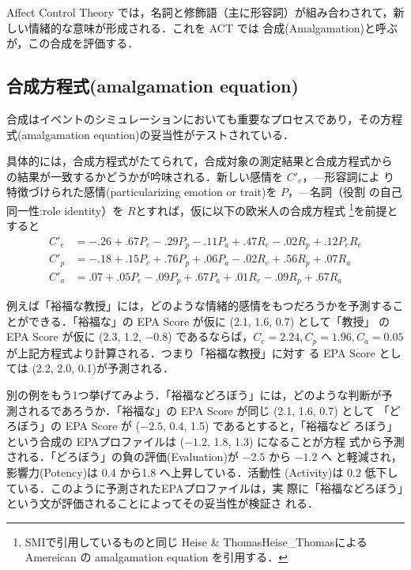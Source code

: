 \documentclass[japanese]{jnlp_1.3d}
\newcommand{\citep}{}
\begin{document}
Affect Control Theory では，名詞と修飾語（主に形容詞）が組み合わされて，新
しい情緒的な意味が形成される．これを ACT では 合成(Amalgamation)と呼ぶ
が，この合成を評価する．



\subsection{合成方程式(amalgamation equation)}
合成はイベントのシミュレーションにおいても重要なプロセスであり，その方程
式(amalgamation equation)の妥当性がテストされている．

具体的には，合成方程式がたてられて，合成対象の測定結果と合成方程式から
の結果が一致するかどうかが吟味される．新しい感情を $C'_e$，—形容詞によ
り特徴づけられた感情(particularizing emotion or trait)を $P$，—名詞（役割
の自己同一性:role identity）を $R$とすれば，仮に以下の欧米人の合成方程式
\footnote{\citep{SMI}で引用しているものと同じ Heise \&
Thomas\citep{Heise_Thomas}による Amereican の amalgamation equation を引用する．}を前提とすると
\begin{align}
\label{key:eqn:amalgamWestern}
 C'_e & = -.26 + .67 P_e -.29 P_p -.11 P_a + .47 R_e - .02 R_p + .12 P_e
  R_e \nonumber \\
 C'_p & = -.18 + .15 P_e +.76 P_p +.06 P_a - .02 R_e + .56 R_p + .07
  R_a \\
 C'_a & =  .07 + .05 P_e -.09 P_p +.67 P_a + .01 R_e - .09 R_p + .67 R_a
  \nonumber 
\end{align}

例えば「裕福な教授」には，どのような情緒的感情をもつだろうかを予測するこ
とができる．「裕福な」の EPA Score が仮に (2.1, 1.6, 0.7) として「教授」
の EPA Score が仮に (2.3, 1.2, $-0.8$) であるならば，$C_e = 2.24,  C_p =
1.96, C_a = 0.05$が上記方程式より計算される．つまり「裕福な教授」に対す
る EPA Score としては (2.2, 2.0, 0.1)が予測される．
 
別の例をもう1つ挙げてみよう．「裕福などろぼう」には，どのような判断が予
測されるであろうか．「裕福な」の EPA Score が同じ (2.1, 1.6, 0.7) として
「どろぼう」の EPA Score が ($-2.5$, 0.4, 1.5) であるとすると，「裕福など
ろぼう」という合成の EPAプロファイルは ($-1.2$, 1.8, 1.3) になることが方程
式から予測される．「どろぼう」の負の評価(Evaluation)が $-2.5$ から $-1.2$ へ
と軽減され，影響力(Potency)は 0.4 から1.8 へ上昇している．活動性
(Activity)は 0.2 低下している．このように予測されたEPAプロファイルは，実
際に「裕福などろぼう」という文が評価されることによってその妥当性が検証さ
れる．
 
\end{document}
